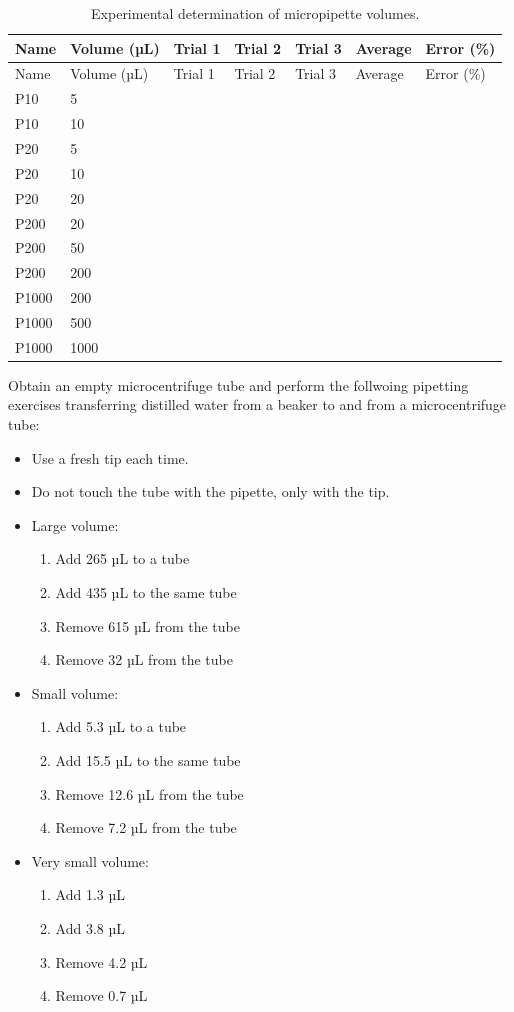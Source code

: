 \documentclass[]{book}
\providecommand{\tightlist}{%
  \setlength{\itemsep}{0pt}\setlength{\parskip}{0pt}}
\theoremstyle{definition}
\theoremstyle{definition}
\theoremstyle{definition}
\theoremstyle{remark}
\begin{document}
\begin{longtable}[]{@{}lllllll@{}}
\caption{\label{tab:micro} Experimental determination of micropipette
volumes.}\tabularnewline
\toprule
Name & Volume (µL) & Trial 1 & Trial 2 & Trial 3 & Average & Error
(\%)\tabularnewline
\midrule
\endfirsthead
\toprule
Name & Volume (µL) & Trial 1 & Trial 2 & Trial 3 & Average & Error
(\%)\tabularnewline
\midrule
\endhead
P10 & 5 & & & & &\tabularnewline
P10 & 10 & & & & &\tabularnewline
P20 & 5 & & & & &\tabularnewline
P20 & 10 & & & & &\tabularnewline
P20 & 20 & & & & &\tabularnewline
P200 & 20 & & & & &\tabularnewline
P200 & 50 & & & & &\tabularnewline
P200 & 200 & & & & &\tabularnewline
P1000 & 200 & & & & &\tabularnewline
P1000 & 500 & & & & &\tabularnewline
P1000 & 1000 & & & & &\tabularnewline
\bottomrule
\end{longtable}

Obtain an empty microcentrifuge tube and perform the follwoing pipetting
exercises transferring distilled water from a beaker to and from a
microcentrifuge tube:

\begin{itemize}
\item
  Use a fresh tip each time.
\item
  Do not touch the tube with the pipette, only with the tip.
\item
  Large volume:

  \begin{enumerate}
  \def\labelenumi{\arabic{enumi}.}
  \tightlist
  \item
    Add 265 µL to a tube
  \item
    Add 435 µL to the same tube
  \item
    Remove 615 µL from the tube
  \item
    Remove 32 µL from the tube
  \end{enumerate}
\item
  Small volume:

  \begin{enumerate}
  \def\labelenumi{\arabic{enumi}.}
  \tightlist
  \item
    Add 5.3 µL to a tube
  \item
    Add 15.5 µL to the same tube
  \item
    Remove 12.6 µL from the tube
  \item
    Remove 7.2 µL from the tube
  \end{enumerate}
\item
  Very small volume:

  \begin{enumerate}
  \def\labelenumi{\arabic{enumi}.}
  \tightlist
  \item
    Add 1.3 µL
  \item
    Add 3.8 µL
  \item
    Remove 4.2 µL
  \item
    Remove 0.7 µL
  \end{enumerate}
\end{itemize}
\end{document}
